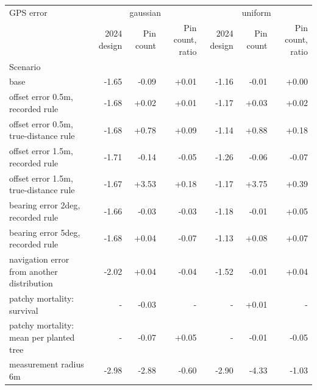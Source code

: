 \begin{tabular}{l|rrr|rrr}
\toprule
GPS error & \multicolumn{3}{c}{gaussian} & \multicolumn{3}{c}{uniform} \\
 & 2024 design & Pin count & Pin count, ratio & 2024 design & Pin count & Pin count, ratio \\
Scenario &  &  &  &  &  &  \\
\midrule
base & -1.65 & -0.09 & +0.01 & -1.16 & -0.01 & +0.00 \\
offset error 0.5m, recorded rule & -1.68 & +0.02 & +0.01 & -1.17 & +0.03 & +0.02 \\
offset error 0.5m, true-distance rule & -1.68 & +0.78 & +0.09 & -1.14 & +0.88 & +0.18 \\
offset error 1.5m, recorded rule & -1.71 & -0.14 & -0.05 & -1.26 & -0.06 & -0.07 \\
offset error 1.5m, true-distance rule & -1.67 & +3.53 & +0.18 & -1.17 & +3.75 & +0.39 \\
bearing error 2deg, recorded rule & -1.66 & -0.03 & -0.03 & -1.18 & -0.01 & +0.05 \\
bearing error 5deg, recorded rule & -1.68 & +0.04 & -0.07 & -1.13 & +0.08 & +0.07 \\
navigation error from another distribution & -2.02 & +0.04 & -0.04 & -1.52 & -0.01 & +0.04 \\
patchy mortality: survival & - & -0.03 & - & - & +0.01 & - \\
patchy mortality: mean per planted tree & - & -0.07 & +0.05 & - & -0.01 & -0.05 \\
measurement radius 6m & -2.98 & -2.88 & -0.60 & -2.90 & -4.33 & -1.03 \\
\bottomrule
\end{tabular}
